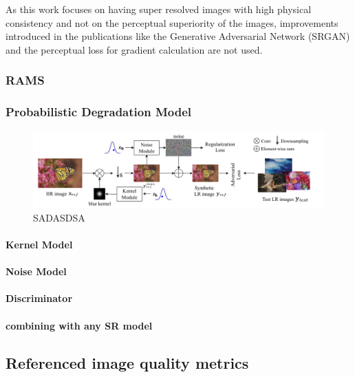             As this work focuses on having super resolved images with high physical consistency and not on the perceptual superiority of the images, improvements introduced in the publications like the Generative Adversarial Network (SRGAN)  and the perceptual loss for gradient calculation are not used.
        

        \subsubsection{RAMS}
        \subsubsection{Probabilistic Degradation Model}

            \begin{figure}[h!]
                \centering
                \includegraphics[scale=0.38]{Includes/3-probabilistic-degradation-model.png}
                \caption{SADASDSA}
                \label{fig:3-probabilistic-degradation-model}
            \end{figure}

            \paragraph{Kernel Model}
            \paragraph{Noise Model}
            \paragraph{Discriminator}
            \paragraph{combining with any SR model}


    \subsection{Referenced image quality metrics}

